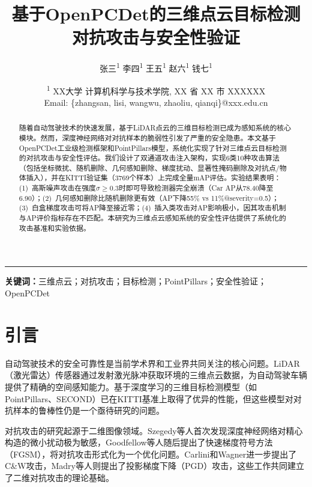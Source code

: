 ﻿\documentclass[12pt,a4paper]{ctexart}
\title{\textbf{基于OpenPCDet的三维点云目标检测对抗攻击与安全性验证}}
\author{
  张三\textsuperscript{1} \quad 李四\textsuperscript{1} \quad 王五\textsuperscript{1} \quad 赵六\textsuperscript{1} \quad 钱七\textsuperscript{1}
}
\date{
  \small\textsuperscript{1} XX大学 计算机科学与技术学院, XX 省 XX 市 XXXXXX\\[2pt]
  \small Email: \{zhangsan, lisi, wangwu, zhaoliu, qianqi\}@xxx.edu.cn
}
\begin{document}
\maketitle

\vspace{-1em}
\noindent\rule{\textwidth}{0.4pt}

\begin{abstract}
随着自动驾驶技术的快速发展，基于LiDAR点云的三维目标检测已成为感知系统的核心模块。然而，深度神经网络对对抗样本的脆弱性引发了严重的安全隐患。本文基于OpenPCDet工业级检测框架和PointPillars模型，系统化实现了针对三维点云目标检测的对抗攻击与安全性评估。我们设计了双通道攻击注入架构，实现6类10种攻击算法（包括坐标微扰、随机删除、几何感知删除、梯度扰动、显著性掩码删除及对抗点/物体插入），并在KITTI验证集（3769个样本）上完成全量mAP评估。实验结果表明：(1)~高斯噪声攻击在强度$\sigma \geq 0.3$时即可导致检测器完全崩溃（Car AP从78.40降至6.90）；(2)~几何感知删除比随机删除更有效（AP下降55\% vs 11\%@severity=0.5）；(3)~白盒梯度攻击可将AP降至接近零；(4)~插入类攻击对AP影响极小，因其攻击机制与AP评价指标存在不匹配。本研究为三维点云感知系统的安全性评估提供了系统化的攻击基准和实验依据。
\end{abstract}

\noindent\textbf{关键词：}三维点云；对抗攻击；目标检测；PointPillars；安全性验证；OpenPCDet

\section{引言}

自动驾驶技术的安全可靠性是当前学术界和工业界共同关注的核心问题。LiDAR（激光雷达）传感器通过发射激光脉冲获取环境的三维点云数据，为自动驾驶车辆提供了精确的空间感知能力。基于深度学习的三维目标检测模型（如PointPillars\cite{lang2019pointpillars}、SECOND\cite{yan2018second}）已在KITTI基准\cite{geiger2012kitti}上取得了优异的性能，但这些模型对对抗样本的鲁棒性仍是一个亟待研究的问题。

对抗攻击的研究起源于二维图像领域。Szegedy等人\cite{szegedy2014intriguing}首次发现深度神经网络对精心构造的微小扰动极为敏感，Goodfellow等人\cite{goodfellow2015explaining}随后提出了快速梯度符号方法（FGSM），将对抗攻击形式化为一个优化问题。Carlini和Wagner\cite{carlini2017towards}进一步提出了C\&W攻击，Madry等人\cite{madry2018towards}则提出了投影梯度下降（PGD）攻击，这些工作共同建立了二维对抗攻击的理论基础。
\end{document}
